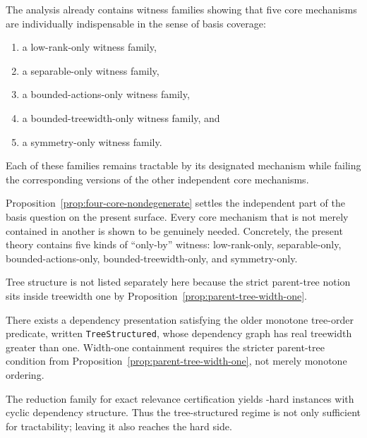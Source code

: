 \begin{proposition}\label{prop:four-core-nondegenerate}
The analysis already contains witness families showing that five core mechanisms are individually indispensable in the sense of basis coverage:
\begin{enumerate}
\item a low-rank-only witness family,
\item a separable-only witness family,
\item a bounded-actions-only witness family,
\item a bounded-treewidth-only witness family, and
\item a symmetry-only witness family.
\end{enumerate}
Each of these families remains tractable by its designated mechanism while failing the corresponding versions of the other independent core mechanisms.
\end{proposition}

Proposition~\ref{prop:four-core-nondegenerate} settles the independent part of the basis question on the present surface. Every core mechanism that is not merely contained in another is shown to be genuinely needed. Concretely, the present theory contains five kinds of ``only-by'' witness: low-rank-only, separable-only, bounded-actions-only, bounded-treewidth-only, and symmetry-only.

Tree structure is not listed separately here because the strict parent-tree notion sits inside treewidth one by Proposition~\ref{prop:parent-tree-width-one}.

\begin{proposition}\label{prop:legacy-tree-gap}
There exists a dependency presentation satisfying the older monotone tree-order predicate, written \texttt{TreeStructured}, whose dependency graph has real treewidth greater than one. Width-one containment requires the stricter parent-tree condition from Proposition~\ref{prop:parent-tree-width-one}, not merely monotone ordering.
\end{proposition}

\begin{proposition}\label{prop:tree-hardness-bridge}
The reduction family for exact relevance certification yields \coNP-hard instances with cyclic dependency structure. Thus the tree-structured regime is not only sufficient for tractability; leaving it also reaches the hard side.
\end{proposition}

